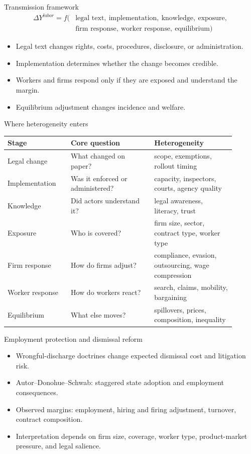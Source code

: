\documentclass[aspectratio=169,11pt]{beamer}
\begin{document}
\begin{frame}{Transmission framework}
\small
\[
\begin{aligned}
\Delta Y^{labor}
= f(&\text{legal text},\ \text{implementation},\ \text{knowledge},\ \text{exposure},\\
&\text{firm response},\ \text{worker response},\ \text{equilibrium})
\end{aligned}
\]
\begin{itemize}
    \item Legal text changes rights, costs, procedures, disclosure, or administration.
    \item Implementation determines whether the change becomes credible.
    \item Workers and firms respond only if they are exposed and understand the margin.
    \item Equilibrium adjustment changes incidence and welfare.
\end{itemize}
\end{frame}

\begin{frame}{Where heterogeneity enters}
\small
\begin{tabular}{p{0.25\linewidth} p{0.33\linewidth} p{0.32\linewidth}}
\toprule
Stage & Core question & Heterogeneity \\
\midrule
Legal change & What changed on paper? & scope, exemptions, rollout timing \\
Implementation & Was it enforced or administered? & capacity, inspectors, courts, agency quality \\
Knowledge & Did actors understand it? & legal awareness, literacy, trust \\
Exposure & Who is covered? & firm size, sector, contract type, worker type \\
Firm response & How do firms adjust? & compliance, evasion, outsourcing, wage compression \\
Worker response & How do workers react? & search, claims, mobility, bargaining \\
Equilibrium & What else moves? & spillovers, prices, composition, inequality \\
\bottomrule
\end{tabular}
\end{frame}

\begin{frame}{Employment protection and dismissal reform}
\begin{itemize}
    \item Wrongful-discharge doctrines change expected dismissal cost and litigation risk.
    \item Autor--Donohue--Schwab: staggered state adoption and employment consequences.
    \item Observed margins: employment, hiring and firing adjustment, turnover, contract composition.
    \item Interpretation depends on firm size, coverage, worker type, product-market pressure, and legal salience.
\end{itemize}
\end{frame}
\end{document}
